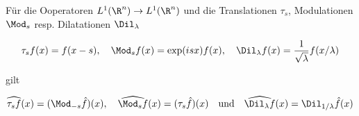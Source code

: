 
\begin{exercise}

Für die Ooperatoren $L^1(\R^n) \to L^1(\R^n)$ und die Translationen $\tau_s$, Modulationen $\Mod_s$ resp. Dilatationen $\Dil_\lambda$

\begin{align*}
    \tau_s f(x) = f(x - s),
    \quad
    \Mod_s f(x) = \exp(i s x) f(x),
    \quad
    \Dil_\lambda f(x) = \frac{1}{\sqrt \lambda} f(x / \lambda)
\end{align*}

gilt

\begin{align*}
    \widehat{\tau_s f}(x) = (\Mod_{-s} \hat f)(x),
    \quad
    \widehat{\Mod_s f}(x) = (\tau_s \hat f)(x)
    \quad
    \text{und}
    \quad
    \widehat{\Dil_\lambda f}(x) = \Dil_{1 / \lambda} \hat f(x)
\end{align*}

\end{exercise}


